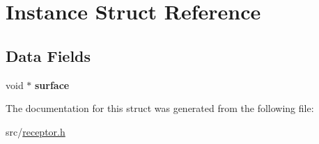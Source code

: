 \hypertarget{structInstance}{\section{Instance Struct Reference}
\label{structInstance}
}
\subsection*{Data Fields}
\begin{DoxyCompactItemize}
\item 
\hypertarget{structInstance_aef3ea7ab3035b71d82ed356fb523367b}{void $\ast$ {\bfseries surface}}\label{structInstance_aef3ea7ab3035b71d82ed356fb523367b}

\end{DoxyCompactItemize}


The documentation for this struct was generated from the following file\+:\begin{DoxyCompactItemize}
\item 
src/\hyperlink{receptor_8h}{receptor.\+h}\end{DoxyCompactItemize}
